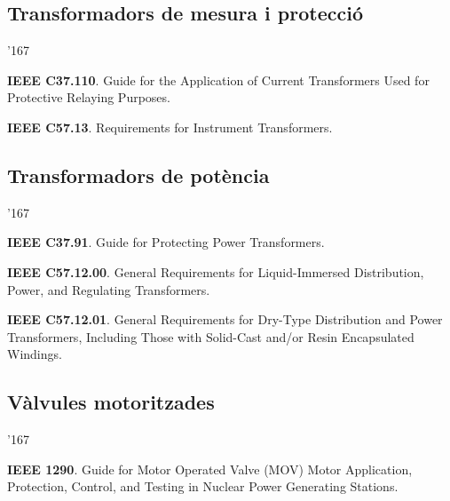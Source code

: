 \subsection*{Transformadors de mesura i protecci\'{o}}
\begin{dinglist}{'167}
    \item \textbf{IEEE C37.110}. Guide for the Application of Current Transformers Used for Protective Relaying Purposes.
    \item \textbf{IEEE C57.13}. Requirements for Instrument Transformers.
\end{dinglist}


\subsection*{Transformadors de pot\`{e}ncia}
\begin{dinglist}{'167}
    \item \textbf{IEEE C37.91}. Guide for Protecting Power Transformers.
    \item \textbf{IEEE C57.12.00}. General Requirements for Liquid-Immersed Distribution, Power, and Regulating Transformers.
    \item \textbf{IEEE C57.12.01}. General Requirements for Dry-Type Distribution and Power Transformers, Including Those with Solid-Cast and/or Resin Encapsulated Windings.
\end{dinglist}



\subsection*{V\`{a}lvules motoritzades}
\begin{dinglist}{'167}
    \item \textbf{IEEE 1290}. Guide for Motor Operated Valve (MOV) Motor Application, Protection, Control, and Testing in Nuclear Power Generating Stations.
\end{dinglist}

